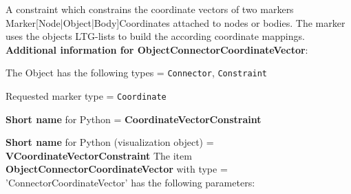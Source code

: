 \label{sec:item:ObjectConnectorCoordinateVector}
A constraint which constrains the coordinate vectors of two markers Marker[Node|Object|Body]Coordinates attached to nodes or bodies. The marker uses the objects LTG-lists to build the according coordinate mappings.\vspace{12pt}
 \\{\bf Additional information for ObjectConnectorCoordinateVector}:
\bi
  \item The Object has the following types = \texttt{Connector}, \texttt{Constraint}
  \item Requested marker type = \texttt{Coordinate}
  \item {\bf Short name} for Python = {\bf CoordinateVectorConstraint}  \item {\bf Short name} for Python (visualization object) = {\bf VCoordinateVectorConstraint}\ei
\vspace{12pt} \noindent The item {\bf ObjectConnectorCoordinateVector} with type = 'ConnectorCoordinateVector' has the following parameters:\vspace{-1cm}\\ 
